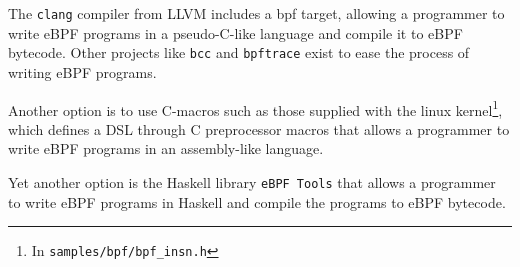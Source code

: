 The \texttt{clang} compiler from LLVM includes a bpf target, allowing a programmer to write eBPF programs in a pseudo-C-like language and compile it to eBPF bytecode.
Other projects like \texttt{bcc}\cite{gh:bcc} and \texttt{bpftrace}\cite{gh:bpftrace} exist to ease the process of writing eBPF programs.

Another option is to use C-macros such as those supplied with the linux kernel\footnote{In \texttt{samples/bpf/bpf\_insn.h}}, which defines a DSL through C preprocessor macros that allows a programmer to write eBPF programs in an assembly-like language.

Yet another option is the Haskell library \texttt{eBPF Tools}\cite{ebpf-tools} that allows a programmer to write eBPF programs in Haskell and compile the programs to eBPF bytecode.  

 

  







